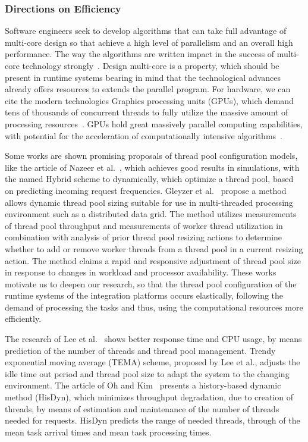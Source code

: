 \subsubsection{{Directions on Efficiency}}
\label{subsubsec:directions_efficiency}
Software engineers seek to develop algorithms that can take full advantage of multi-core design so that achieve a high level of parallelism and an overall high performance. The way the algorithms are written impact in the success of multi-core technology strongly~\cite{sethi2015}. Design multi-core is a property, which should be present in runtime systems bearing in mind that the technological advances already offers resources to extends the parallel program. For hardware, we can cite the modern technologies Graphics processing units (GPUs), which demand tens of thousands of concurrent threads to fully utilize the massive amount of processing resources~\cite{yoon2016}. GPUs hold great massively parallel computing capabilities, with potential for the acceleration of computationally intensive algorithms~\cite{tang2017}. 

Some works are shown promising proposals of thread pool configuration models, like the article of Nazeer et al.~\cite{nazeer2016}, which achieves good results in simulations, with the named Hybrid scheme to dynamically, which optimize a thread pool, based on predicting incoming request frequencies. Gleyzer et al.~\cite{gleyzer2017} propose a method allows dynamic thread pool sizing suitable for use in multi-threaded processing environment such as a distributed data grid. The method utilizes measurements of thread pool throughput and measurements of worker thread utilization in combination with analysis of prior thread pool resizing actions to determine whether to add or remove worker threads from a thread pool in a current resizing action. The method claims a rapid and responsive adjustment of thread pool size in response to changes in workload and processor availability. These works motivate us to deepen our research, so that the thread pool configuration of the runtime systems of the integration platforms occurs elastically, following the demand of processing the tasks and thus, using the computational resources more efficiently.

The research of Lee et al.~\cite{lee2011} shows better response time and CPU usage, by means prediction of the number of threads and thread pool management. Trendy exponential moving average (TEMA) scheme, proposed by Lee et al., adjusts the idle time out period and thread pool size to adapt the system to the changing environment. The article of Oh and Kim~\cite{oh2013} presents a history-based dynamic method (HisDyn), which minimizes throughput degradation, due to creation of threads, by means of estimation and maintenance of the number of threads needed for requests. HisDyn predicts the range of needed threads, through of the mean task arrival times and mean task processing times.


